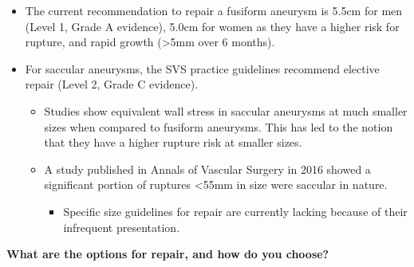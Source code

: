 \documentclass[
]{book}
\providecommand{\tightlist}{%
  \setlength{\itemsep}{0pt}\setlength{\parskip}{0pt}}
\begin{document}
\begin{itemize}
\item
  The current recommendation to repair a fusiform aneurysm is 5.5cm
  for men (Level 1, Grade A evidence), 5.0cm for women as they have a
  higher risk for rupture, and rapid growth (\textgreater5mm over 6 months).
  \citep{chaikofSocietyVascularSurgery2018a}
\item
  For saccular aneurysms, the SVS practice guidelines recommend
  elective repair (Level 2, Grade C evidence).
  \citep{chaikofSocietyVascularSurgery2018a}

  \begin{itemize}
  \item
    Studies show equivalent wall stress in saccular aneurysms at
    much smaller sizes when compared to fusiform aneurysms. This has
    led to the notion that they have a higher rupture risk at
    smaller sizes.
  \item
    A study published in Annals of Vascular Surgery in 2016 showed a
    significant portion of ruptures \textless55mm in size were saccular in
    nature. \citep{kristmundssonMorphologySmallAbdominal2016}

    \begin{itemize}
    \tightlist
    \item
      Specific size guidelines for repair are currently lacking
      because of their infrequent presentation.
    \end{itemize}
  \end{itemize}
\end{itemize}

\textbf{What are the options for repair, and how do you choose?}
\citep{mooreVascularEndovascularSurgery2019, fairman72AortoiliacAneurysms2019}
\end{document}
